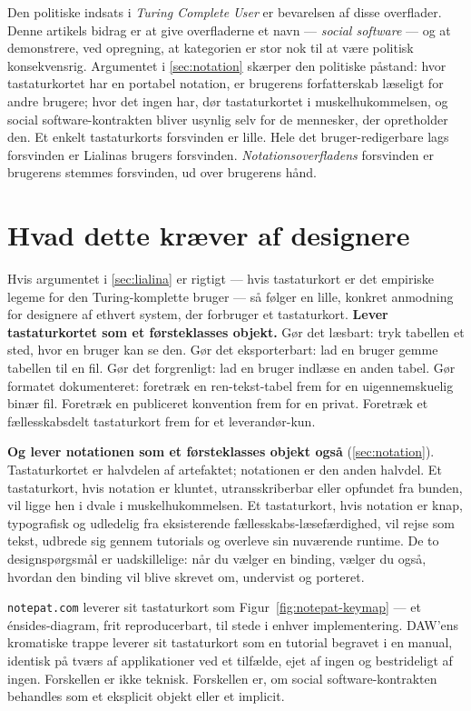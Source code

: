 \documentclass[10pt,letterpaper,twocolumn]{article}
\begin{document}
Den politiske indsats i \emph{Turing Complete User} er bevarelsen af disse overflader. Denne artikels bidrag er at give overfladerne et navn --- \emph{social software} --- og at demonstrere, ved opregning, at kategorien er stor nok til at være politisk konsekvensrig. Argumentet i \textsection\ref{sec:notation} skærper den politiske påstand: hvor tastaturkortet har en portabel notation, er brugerens forfatterskab læseligt for andre brugere; hvor det ingen har, dør tastaturkortet i muskelhukommelsen, og social software-kontrakten bliver usynlig selv for de mennesker, der opretholder den. Et enkelt tastaturkorts forsvinden er lille. Hele det bruger-redigerbare lags forsvinden er Lialinas brugers forsvinden. \emph{Notationsoverfladens} forsvinden er brugerens stemmes forsvinden, ud over brugerens hånd.

\section{Hvad dette kræver af designere}
\label{sec:design}

Hvis argumentet i \textsection\ref{sec:lialina} er rigtigt --- hvis tastaturkort er det empiriske legeme for den Turing-komplette bruger --- så følger en lille, konkret anmodning for designere af ethvert system, der forbruger et tastaturkort. \textbf{Lever tastaturkortet som et førsteklasses objekt.} Gør det læsbart: tryk tabellen et sted, hvor en bruger kan se den. Gør det eksporterbart: lad en bruger gemme tabellen til en fil. Gør det forgrenligt: lad en bruger indlæse en anden tabel. Gør formatet dokumenteret: foretræk en ren-tekst-tabel frem for en uigennemskuelig binær fil. Foretræk en publiceret konvention frem for en privat. Foretræk et fællesskabsdelt tastaturkort frem for et leverandør-kun.

\textbf{Og lever notationen som et førsteklasses objekt også} (\textsection\ref{sec:notation}). Tastaturkortet er halvdelen af artefaktet; notationen er den anden halvdel. Et tastaturkort, hvis notation er kluntet, utransskriberbar eller opfundet fra bunden, vil ligge hen i dvale i muskelhukommelsen. Et tastaturkort, hvis notation er knap, typografisk og udledelig fra eksisterende fællesskabs-læsefærdighed, vil rejse som tekst, udbrede sig gennem tutorials og overleve sin nuværende runtime. De to designspørgsmål er uadskillelige: når du vælger en binding, vælger du også, hvordan den binding vil blive skrevet om, undervist og porteret.

\texttt{notepat.com} leverer sit tastaturkort som Figur~\ref{fig:notepat-keymap} --- et énsides-diagram, frit reproducerbart, til stede i enhver implementering. DAW'ens kromatiske trappe leverer sit tastaturkort som en tutorial begravet i en manual, identisk på tværs af applikationer ved et tilfælde, ejet af ingen og bestrideligt af ingen. Forskellen er ikke teknisk. Forskellen er, om social software-kontrakten behandles som et eksplicit objekt eller et implicit.
\end{document}
